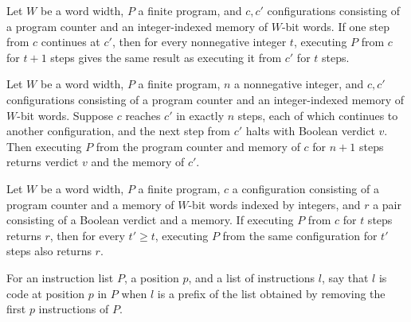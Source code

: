 \begin{theorem}
\label{WordRAM.exec_succ_of_step}
\leanok
{}
Let $W$ be a word width, $P$ a finite program, and $c,c'$ configurations consisting of a
program counter and an integer-indexed memory of $W$-bit words. If one step from $c$
continues at $c'$, then for every nonnegative integer $t$, executing $P$ from $c$ for
$t+1$ steps gives the same result as executing it from $c'$ for $t$ steps.
\end{theorem}

\begin{theorem}
\label{WordRAM.exec_of_steps}
\leanok
{}
Let $W$ be a word width, $P$ a finite program, $n$ a nonnegative integer, and $c,c'$
configurations consisting of a program counter and an integer-indexed memory of $W$-bit
words. Suppose $c$ reaches $c'$ in exactly $n$ steps, each of which continues to another
configuration, and the next step from $c'$ halts with Boolean verdict $v$. Then
executing $P$ from the program counter and memory of $c$ for $n+1$ steps returns verdict
$v$ and the memory of $c'$.
\end{theorem}

\begin{theorem}
\label{WordRAM.exec_mono}
\leanok
{}
Let $W$ be a word width, $P$ a finite program, $c$ a configuration consisting of a
program counter and a memory of $W$-bit words indexed by integers, and $r$ a pair
consisting of a Boolean verdict and a memory. If executing $P$ from $c$ for $t$ steps
returns $r$, then for every $t'\ge t$, executing $P$ from the same configuration for
$t'$ steps also returns $r$.
\end{theorem}

\begin{definition}
\label{WordRAM.CodeAt}
\leanok
{}
For an instruction list $P$, a position $p$, and a list of instructions $l$, say that
$l$ is code at position $p$ in $P$ when $l$ is a prefix of the list obtained by removing
the first $p$ instructions of $P$.
\end{definition}

